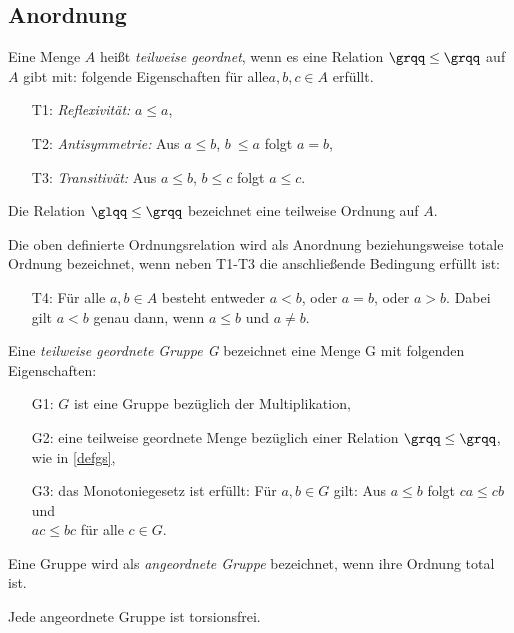 \subsection{Anordnung}
\begin{defn}\label{defgs} 
Eine Menge $A$ heißt \textit{teilweise geordnet}, wenn es eine Relation $ \grqq\leq\grqq $ auf $A$ gibt mit: folgende Eigenschaften für alle$ a,b,c \in A$  erfüllt.
%
\begin{enumerate}
\item[T1:] \textit{Reflexivität: } $a \leq  a$,
\item[T2:] \textit{Antisymmetrie: } Aus $a \leq  b$, $b~ \leq a$ folgt $a = b$,
\item[T3:] \textit{Transitivät: } Aus $a \leq b$, $b \leq c$ folgt $a \leq c$.
\end{enumerate}
%
Die Relation $\glqq \leq\grqq$ bezeichnet eine teilweise Ordnung auf $A$.
\end{defn}
Die oben definierte Ordnungsrelation wird als Anordnung beziehungsweise totale Ordnung bezeichnet, wenn neben T1-T3 die anschließende Bedingung erfüllt ist:
%
\begin{enumerate}
\item[T4:] Für alle $a, b \in A$ besteht entweder $a < b$, oder $a = b$, oder $a > b$. Dabei gilt $a < b$ genau dann, wenn $a \leq b$ und $a\neq b$. 
\end{enumerate}
%
%
\begin{defn}\label{twgG} %
Eine \textit{teilweise geordnete Gruppe G} bezeichnet eine Menge G mit folgenden Eigenschaften: 
%
\begin{enumerate}
\item[G1:] $G$ ist eine Gruppe bezüglich der Multiplikation,
\item[G2:] eine teilweise geordnete Menge bezüglich einer Relation $ \grqq\leq\grqq $, wie in \ref{defgs}, 
\item[G3:] das Monotoniegesetz ist erfüllt: Für $a, b \in  G$ gilt: Aus $a \leq b$ folgt $ca \leq  cb$ und \\ $ac \leq bc$ für alle $c \in G$.
\end{enumerate}
% 
\end{defn}
%
%
\begin{defn}\label{agG}
Eine Gruppe wird als \textit{angeordnete Gruppe} bezeichnet, wenn ihre Ordnung total ist.
\end{defn}
%
\begin{satz} \label{angeordnetFolgtTorsionsfrei} %
Jede angeordnete Gruppe ist torsionsfrei. 
\end{satz}
%
